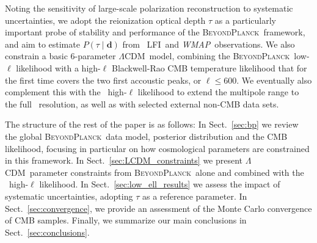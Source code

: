 \documentclass[twocolumn]{aa}
\def\WMAP{\textit{WMAP}}
\def\LCDM{$\Lambda$CDM}
\newcommand{\BP}{\textsc{BeyondPlanck}}
\newcommand{\lfi}[0]{LFI}
\begin{document}
Noting the sensitivity of large-scale polarization reconstruction 
to systematic uncertainties, we adopt the reionization optical depth $\tau$ as a
particularly important probe of stability and performance of the
\BP\ framework, and aim to estimate $P(\tau\mid\mathbf{d})$ from
\Planck\ \lfi\ and \WMAP\ observations. We also constrain a basic
$6$-parameter \LCDM\ model, combining the \BP\ low-$\ell$ likelihood
with a high-$\ell$ Blackwell-Rao CMB temperature likelihood that for
the first time covers the two first accoustic peaks, or
$\ell\le600$. We eventually also complement this with the
\Planck\ high-$\ell$ likelihood to extend the multipole range to the
full \Planck\ resolution, as well as with selected external non-CMB data
sets.

The structure of the rest of the paper is as follows: In
Sect.~\ref{sec:bp} we review the global \BP\ data model, posterior
distribution and the CMB likelihood, focusing in particular on how
cosmological parameters are constrained in this framework. In
Sect.~\ref{sec:LCDM_constraints} we present \LCDM\ parameter
constraints from \BP\ alone and combined with the \Planck\ high-$\ell$
likelihood. In Sect.~\ref{sec:low_ell_results} we assess the impact
of systematic uncertainties, adopting $\tau$ as a reference
parameter. In Sect.~\ref{sec:convergence}, we provide an assessment of
the Monte Carlo convergence of CMB samples. Finally, we summarize our
main conclusions in Sect.~\ref{sec:conclusions}.
\end{document}
